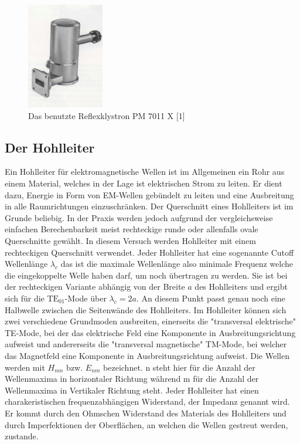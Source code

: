 \begin{figure}
    \centering
    \includegraphics[width=0.3\textwidth,angle=0]{content/grafiken/Klystron.PNG}
    \caption{Das benutzte Reflexklystron PM 7011 X [1]}
    \label{fig:Klystron}
  \end{figure}

\subsection{Der Hohlleiter}
\label{sec:thwellenleiter}
Ein Hohlleiter für elektromagnetische Wellen ist im Allgemeinen ein Rohr aus einem Material, welches in der 
Lage ist elektrischen Strom zu leiten. Er dient dazu, Energie in Form von EM-Wellen gebündelt zu leiten und
eine Ausbreitung in alle Raumrichtungen einzuschränken. Der Querschnitt eines Hohlleiters ist im Grunde 
beliebig. In der Praxis werden jedoch aufgrund der vergleichsweise einfachen Berechenbarkeit meist rechteckige
runde oder allenfalls ovale Querschnitte gewählt. In diesem Versuch werden Hohlleiter mit einem rechteckigen
Querschnitt verwendet. Jeder Hohlleiter hat eine sogenannte Cutoff Wellenlänge $\lambda_c$ das ist die maximale
Wellenlänge also minimale Frequenz welche die eingekoppelte Welle haben darf, um noch übertragen zu werden.
Sie ist bei der rechteckigen Variante abhängig von der Breite $a$ des Hohlleiters und ergibt sich für die 
$\mathrm{TE}_{01}$-Mode über  $\lambda_c=2a$. An diesem Punkt
passt genau noch eine Halbwelle zwischen die Seitenwände des Hohlleiters. Im Hohlleiter können sich zwei verschiedene
Grundmoden ausbreiten, einerseits die "transversal elektrische" TE-Mode, bei der das elektrische Feld eine Komponente
in Ausbreitungsrichtung aufweist und andererseits die "transversal magnetische" TM-Mode, bei welcher das Magnetfeld
eine Komponente in Ausbreitungsrichtung aufweist. Die Wellen werden mit $H_{nm}$ bzw. $E_{nm}$
bezeichnet. n steht hier für die Anzahl der Wellenmaxima in horizontaler Richtung während m für die Anzahl der 
Wellenmaxima in Vertikaler Richtung steht. Jeder Hohlleiter hat einen charakeristischen frequenzabhängigen
Widerstand, der Impedanz genannt wird. Er kommt durch den Ohmschen Widerstand des Materials des Hohlleiters
und durch Imperfektionen der Oberflächen, an welchen die Wellen gestreut werden, zustande.


